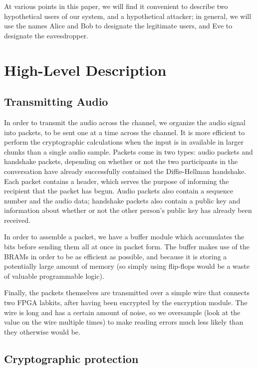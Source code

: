 \documentclass[a4paper]{report}
\begin{document}
At various points in this paper, we will %
find it convenient to describe two hypothetical users of our system, and a hypothetical attacker; in general, we will %
use the names Alice and Bob to designate the legitimate users, and Eve to designate the eavesdropper.

\chapter{High-Level Description}

\section{Transmitting Audio}

In order to transmit the audio across the channel, we organize the audio
signal into packets, to be sent one at a time across the channel. It is more
efficient to perform the cryptographic calculations when the input is in
available in larger chunks than a single audio sample. Packets come in two types: audio packets and handshake packets, depending on whether or not the two participants in the conversation have already successfully contained the Diffie-Hellman handshake. Each packet
contains a header, which serves the purpose of informing the recipient that the packet has begun. Audio packets also contain a sequence number and the audio data; handshake packets also contain a public key and information about whether or not the other person's public key has already been received. 

In order to assemble a packet, we have a buffer module which 
accumulates the bits before sending them all at once in packet form. The buffer
makes use of the BRAMs in order to be as efficient as possible, and because
it is storing a potentially large amount of memory (so simply using
flip-flops would be a waste of valuable programmable logic).

Finally, the packets themselves are transmitted over a simple wire that
connects two FPGA labkits, after having been encrypted by the encryption module.
The wire is long and has a certain amount of noise, so we oversample (look at the value on the wire multiple times) to make reading errors much less likely than they otherwise would be.

\section{Cryptographic protection}
\end{document}
